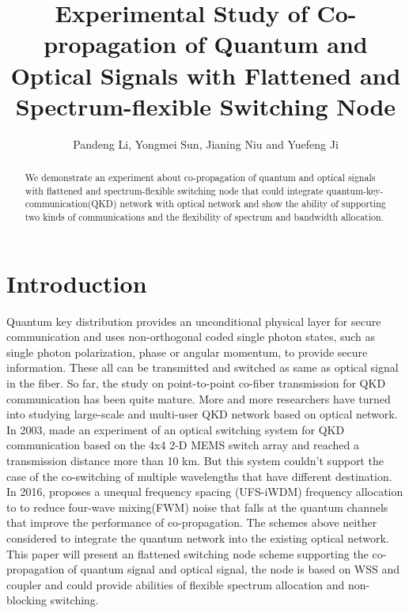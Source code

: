 \documentclass[letterpaper,10pt]{article}
\begin{document}
\title{Experimental Study of Co-propagation of Quantum and Optical Signals with Flattened and Spectrum-flexible Switching Node}
\author{Pandeng Li, Yongmei Sun, Jianing Niu and Yuefeng Ji}
\address{State Key Laboratory of Information Photonics and Optical Communications, School of Information and Telecommunication Engineering, BUPT Beijing, China, 100876}

\begin{abstract}
We demonstrate an experiment about co-propagation of quantum and optical signals with flattened and spectrum-flexible switching node that could integrate quantum-key-communication(QKD) network with optical network and show the ability of supporting two kinds of communications and the flexibility of spectrum and bandwidth allocation.
\end{abstract}

\section{Introduction}

Quantum key distribution provides an unconditional physical layer for secure communication and uses non-orthogonal coded single photon states, such as single photon polarization, phase or angular momentum, to provide secure information. These all can be transmitted and switched as same as optical signal in the fiber. So far, the study on point-to-point co-fiber transmission for QKD communication has been quite mature. More and more researchers have turned into studying large-scale and multi-user QKD network based on optical network. In 2003, \cite{ToliverPaul} made an experiment of an optical switching system for QKD communication based on the 4x4 2-D MEMS switch array and reached a transmission distance more than 10 km. But this system couldn't support the case of the co-switching of multiple wavelengths that have different destination. In 2016, \cite{YongmeiSun} proposes a unequal frequency spacing (UFS-iWDM) frequency allocation to to reduce four-wave mixing(FWM) noise that falls at the quantum channels that improve the performance of co-propagation. The schemes above neither considered to integrate the quantum network into the existing optical network. This paper will present an flattened switching node scheme supporting the co-propagation of quantum signal and optical signal, the node is based on WSS and coupler and could provide abilities of flexible spectrum allocation and non-blocking switching.
\end{document}
